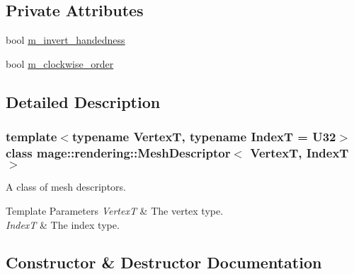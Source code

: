 \subsection*{Private Attributes}
\begin{DoxyCompactItemize}
\item 
bool \mbox{\hyperlink{classmage_1_1rendering_1_1_mesh_descriptor_a61d5b541414f827f43ec835c7f2da462}{m\+\_\+invert\+\_\+handedness}}
\item 
bool \mbox{\hyperlink{classmage_1_1rendering_1_1_mesh_descriptor_a24ad440002ac7a4db6f0cb642ae1477d}{m\+\_\+clockwise\+\_\+order}}
\end{DoxyCompactItemize}


\subsection{Detailed Description}
\subsubsection*{template$<$typename VertexT, typename IndexT = U32$>$\newline
class mage\+::rendering\+::\+Mesh\+Descriptor$<$ Vertex\+T, Index\+T $>$}

A class of mesh descriptors.


\begin{DoxyTemplParams}{Template Parameters}
{\em VertexT} & The vertex type. \\
\hline
{\em IndexT} & The index type. \\
\hline
\end{DoxyTemplParams}


\subsection{Constructor \& Destructor Documentation}
\mbox{\label{classmage_1_1rendering_1_1_mesh_descriptor_a1b0ebe38d5591dda224370a7533f0c13}} 
